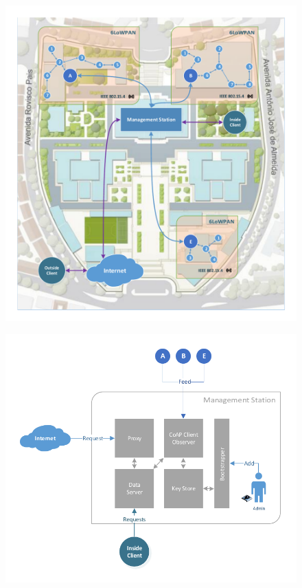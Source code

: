 \documentclass{llncs}
\begin{document}
\begin{figure}
\centering
\begin{minipage}{.55\linewidth}
  \centering
  \includegraphics[width=1\linewidth]{figures/Global_Architecture.pdf}
  \label{fig:global_architecture}
\end{minipage}%
\begin{minipage}{.55\linewidth}
  \centering
  \includegraphics[width=1\linewidth]{figures/White_Box_Model.pdf}
  \label{fig:white_box}
\end{minipage}
\end{figure}
\end{document}
